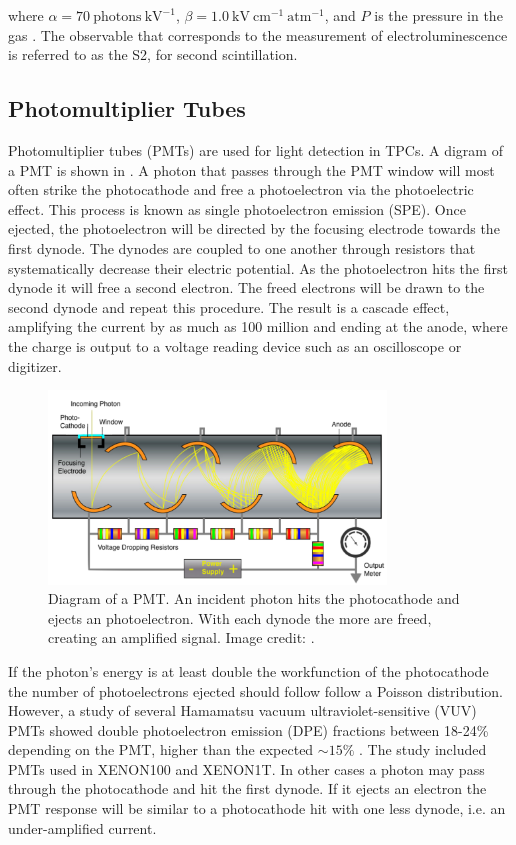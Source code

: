 \noindent where $\alpha = 70\ \mathrm{photons\ kV^{-1}}$, $\beta = 1.0\ \mathrm{kV\ cm^{-1}\ atm^{-1}}$, and $P$ is the pressure in the
gas .  The observable that corresponds to the measurement of electroluminescence is referred to as the S2, for
second scintillation.


\subsection{Photomultiplier Tubes}
\label{subsec:tpcs_pmts}
Photomultiplier tubes (PMTs) are used for light detection in TPCs.  A digram of a PMT is shown in .  A
photon that
passes through the PMT window will most often strike the photocathode and free a photoelectron via the photoelectric effect.  This process
is known as single photoelectron emission (SPE).  Once ejected, the photoelectron will be directed by the focusing electrode towards the
first dynode.  The dynodes are coupled to one another through resistors that systematically decrease their electric potential.  As the
photoelectron hits the first dynode it will free a second electron.  The freed electrons will be drawn to the
second dynode and repeat this procedure.  The result is a cascade effect, amplifying the current by as much as 100 million and ending
at the anode, where the charge is output to a voltage reading device such as an oscilloscope or digitizer.

\begin{figure}
\centering
\includegraphics[width=0.8\textwidth]{PMT1Better}
\caption{Diagram of a PMT.  An incident photon hits the photocathode and ejects an photoelectron.  With each dynode the more \electron are
freed, creating an amplified signal.  Image credit: .}
\label{fig:tpcs_pmts_pmt_diagram}
\end{figure}

If the photon's energy is at least double the workfunction of the photocathode the number of photoelectrons ejected should follow
follow a Poisson distribution.  However, a study of several Hamamatsu vacuum ultraviolet-sensitive (VUV) PMTs showed double
photoelectron emission
(DPE) fractions between 18-24\% depending on the PMT, higher than the expected ${\sim} 15\%$ .  The study included PMTs
used in XENON100 and XENON1T.  In other cases a photon may pass through the photocathode and hit
the first dynode.  If it ejects an electron the PMT response
will be similar to a photocathode hit with one less dynode, i.e. an under-amplified current.  

